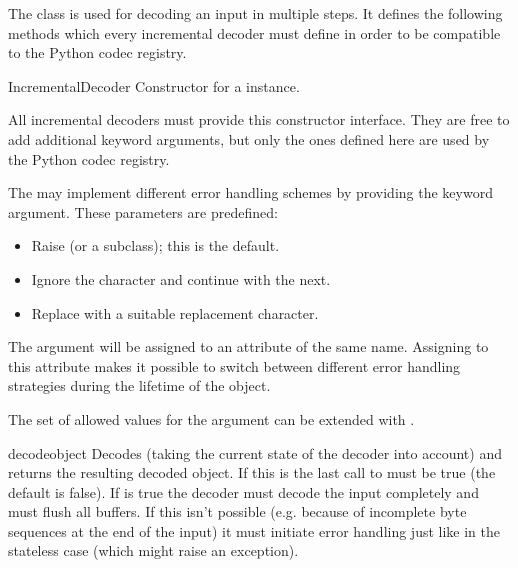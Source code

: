 The  class is used for decoding an input in multiple
steps. It defines the following methods which every incremental decoder must
define in order to be compatible to the Python codec registry.

\begin{classdesc}{IncrementalDecoder}{}
  Constructor for a  instance.

  All incremental decoders must provide this constructor interface. They are
  free to add additional keyword arguments, but only the ones defined
  here are used by the Python codec registry.

  The  may implement different error handling
  schemes by providing the  keyword argument. These
  parameters are predefined:

  \begin{itemize}
    \item {} Raise  (or a subclass);
                          this is the default.
    \item {} Ignore the character and continue with the next.
    \item {} Replace with a suitable replacement character.
  \end{itemize}

  The  argument will be assigned to an attribute of the
  same name. Assigning to this attribute makes it possible to switch
  between different error handling strategies during the lifetime
  of the  object.

  The set of allowed values for the  argument can
  be extended with .
\end{classdesc}

\begin{methoddesc}{decode}{object}
  Decodes  (taking the current state of the decoder into account)
  and returns the resulting decoded object. If this is the last call to
    must be true (the default is false).
  If  is true the decoder must decode the input completely and must
  flush all buffers. If this isn't possible (e.g. because of incomplete byte
  sequences at the end of the input) it must initiate error handling just like
  in the stateless case (which might raise an exception).
\end{methoddesc}

